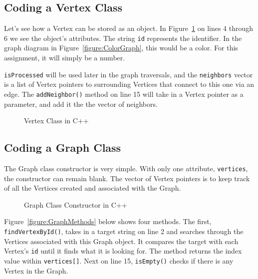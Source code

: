 \documentclass[letterpaper, 10pt,DIV=13]{scrartcl}
\numberwithin{equation}{section} %
\numberwithin{figure}{section} %
\numberwithin{table}{section} %
\begin{document}
\pagebreak

\subsection{Coding a Vertex Class}

Let's see how a Vertex can be stored as an object. In Figure~\ref{figure:VertexClass} on lines 4 through 6 we see the object's attributes. The string \texttt{id} represents the identifier. In the graph diagram in Figure~\ref{figure:ColorGraph}, this would be a color. For this assignment, it will simply be a number. 

\texttt{isProcessed} will be used later in the graph traversals, and the \texttt{neighbors} vector is a list of Vertex pointers to surrounding Vertices that connect to this one via an edge. The \texttt{addNeighbor()} method on line 15 will take in a Vertex pointer as a parameter, and add it the the vector of neighbors.

\begin{figure}[ht] 
    \centering 
    
    \caption{Vertex Class in C++}
    \label{figure:VertexClass}
\end{figure}


\subsection{Coding a Graph Class}

The Graph class constructor is very simple. With only one attribute, \texttt{vertices}, the constructor can remain blank. The vector of Vertex pointers is to keep track of all the Vertices created and associated with the Graph.

\begin{figure}[ht] 
    \centering 
    
    \caption{Graph Class Constructor in C++}
    \label{figure:GraphConstructor}
\end{figure}


\pagebreak
Figure~\ref{figure:GraphMethods} below shows four methods. The first, \texttt{findVertexById()}, takes in a target string on line 2 and searches through the Vertices associated with this Graph object. It compares the target with each Vertex's \texttt{id} until it finds what it is looking for. The method returns the index value within \texttt{vertices[]}. Next on line 15, \texttt{isEmpty()} checks if there is any Vertex in the Graph. 
\end{document}
